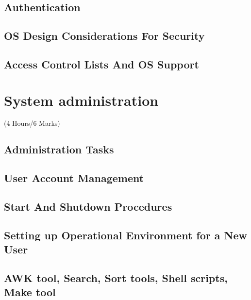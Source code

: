 \documentclass[12pt]{article}
\begin{document}
\subsection{Authentication}
\subsection{OS Design Considerations For Security}
\subsection{Access Control Lists And OS Support}

\pagebreak
\section{System administration}
\begin{center}(4 Hours/6 Marks)\end{center}
\subsection{Administration Tasks}
\subsection{User Account Management}
\subsection{Start And Shutdown Procedures}
\subsection{Setting up Operational Environment for a New User}
\subsection{AWK tool, Search, Sort tools, Shell scripts, Make tool}
\end{document}
